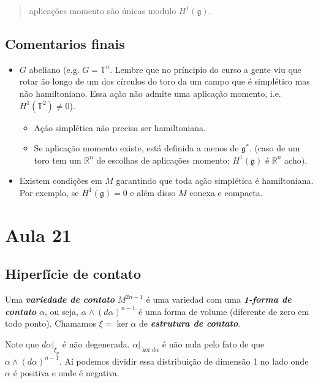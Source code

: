 {\color{8}\begin{quotation}
	aplicações  momento são únicas modulo $H^{1}(\mathfrak{g})$.
\end{quotation}}

\subsection{Comentarios finais}

\begin{itemize}
\item $G$ abeliano (e.g. $G=\mathbb{T}^n$. Lembre que no príncipio do curso a gente viu que rotar ão longo de um dos círculos do toro da um campo que é simplético mas não hamiltoniano. Essa ação não admite uma aplicação momento, i.e. $ H^{1}(\mathbb{T}^2)\neq 0$).
	\begin{itemize}
	\item Ação simplética não precisa ser hamiltoniana.
	\item Se  aplicação momento existe, está definida a menos de $\mathfrak{g}^*$. (caso de um toro tem um $\mathbb{R}^{n}$ de escolhas de aplicações  momento; $H^{1}(\mathfrak{g})$ é $\mathbb{R}^{n}$ acho).
	\end{itemize}

\item Existem condições em $M$ garantindo que toda ação simplética é hamiltoniana. Por exemplo, se $H^{1}(\mathfrak{g})=0$ e além disso $M$ conexa  e compacta.
\end{itemize}

\section{Aula 21}

\subsection{Hiperfície de contato}

\begin{defn}\leavevmode
	Uma \textit{\textbf{variedade de contato}} $M^{2n-1}$ é uma variedad com uma \textit{\textbf{1-forma de contato}} $\alpha$, ou seja, $\alpha\wedge (d\alpha)^{n-1}$ é uma forma de volume (diferente de zero em todo ponto). Chamamos $\xi=\ker \alpha$ de \textit{\textbf{estrutura de contato}}.
\end{defn}

Note que $d\alpha|_{\xi_p}$ é não degenerada. $\alpha |_{\ker d\alpha}$ é não nula pelo fato de que $\alpha\wedge (d\alpha)^{n-1}$. Aí podemos dividir essa distribuição de dimensão 1 no lado onde $\alpha$ é  positiva e onde é negativa.

